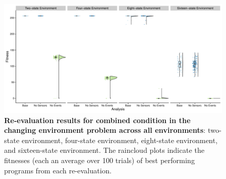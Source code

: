 \begin{figure}[h]
  \includegraphics[width=\columnwidth]
  {chapters/04-evolving-event-driven-programs-with-signalgp/media/chg-env-combined-strategy.pdf}
  \caption{\small 
  \textbf{Re-evaluation results for combined condition in the changing environment problem across all environments}:  two-state environment, four-state environment, eight-state environment, and sixteen-state environment. 
  The raincloud plots indicate the fitnesses (each an average over 100 trials) of best performing programs from each re-evaluation.
  }
  \label{chapter:signalgp:fig:combined-reeval}
\end{figure}
